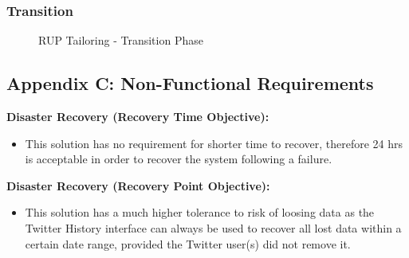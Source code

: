 \documentclass[12pt]{article} %
\begin{document}
		\newpage
	
	\subsubsection{Transition}
	
			\begin{figure}[H] %
				\caption{RUP Tailoring - Transition Phase}
				\label{fig:speciation}
			\end{figure}
			
			\newpage
	
	\subsection{Appendix C: Non-Functional Requirements}
	
	\textbf{Disaster Recovery (Recovery Time Objective):}
	
	\begin{itemize}
		\item This solution has no requirement for shorter time to recover, therefore 24 hrs is acceptable in order to recover the system following a failure.
	\end{itemize}
	
	\textbf{Disaster Recovery (Recovery Point Objective):}
	
	\begin{itemize}
		\item This solution has a much higher tolerance to risk of loosing data as the Twitter History interface can always be used to recover all lost data within a certain date range, provided the Twitter user(s) did not remove it.
	\end{itemize}
	
\end{document}
